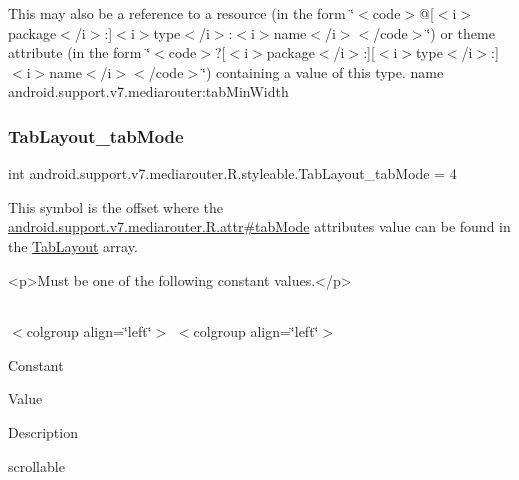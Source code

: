 This may also be a reference to a resource (in the form \char`\"{}$<$code$>$@\mbox{[}$<$i$>$package$<$/i$>$\+:\mbox{]}$<$i$>$type$<$/i$>$\+:$<$i$>$name$<$/i$>$$<$/code$>$\char`\"{}) or theme attribute (in the form \char`\"{}$<$code$>$?\mbox{[}$<$i$>$package$<$/i$>$\+:\mbox{]}\mbox{[}$<$i$>$type$<$/i$>$\+:\mbox{]}$<$i$>$name$<$/i$>$$<$/code$>$\char`\"{}) containing a value of this type.  name android.\+support.\+v7.\+mediarouter\+:tab\+Min\+Width \mbox{\label{classandroid_1_1support_1_1v7_1_1mediarouter_1_1R_1_1styleable_aac3d8271420cd633662292cba1169951}} 
\subsubsection{\texorpdfstring{Tab\+Layout\+\_\+tab\+Mode}{TabLayout\_tabMode}}
{\footnotesize\ttfamily int android.\+support.\+v7.\+mediarouter.\+R.\+styleable.\+Tab\+Layout\+\_\+tab\+Mode = 4\hspace{0.3cm}{\ttfamily [static]}}

This symbol is the offset where the \hyperlink{classandroid_1_1support_1_1v7_1_1mediarouter_1_1R_1_1attr_a598c6a873d7dba4fecfaefe13727745c}{android.\+support.\+v7.\+mediarouter.\+R.\+attr\#tab\+Mode} attribute\textquotesingle{}s value can be found in the \hyperlink{classandroid_1_1support_1_1v7_1_1mediarouter_1_1R_1_1styleable_a94de1350e0a902b4a974d775f2f4f25e}{Tab\+Layout} array.

\begin{DoxyVerb}      <p>Must be one of the following constant values.</p>
\end{DoxyVerb}
 \tabulinesep=1mm
\begin{longtabu} spread 0pt [c]{*{0}{|X[-1]}|}
\hline
\end{longtabu}
$<$colgroup align=\char`\"{}left\char`\"{}$>$ $<$colgroup align=\char`\"{}left\char`\"{}$>$ 

Constant

Value

Description 

{\ttfamily scrollable}

